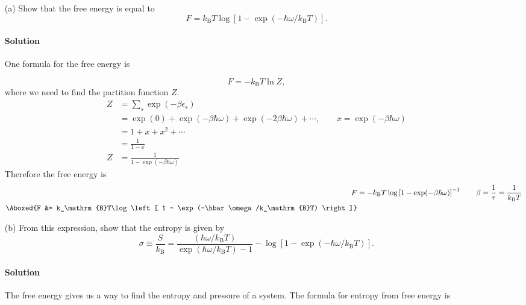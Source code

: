 \documentclass{article}
\begin{document}
	\begin{enumerate}
		\item[(a)] Show that the free energy is equal to
		\begin{equation}
			F = k_\mathrm{B}T \log\left[ 1 - \exp(-\hbar\omega/k_\mathrm{B}T) \right]. \label{FreeEnergyQuestion}
		\end{equation}
		\paragraph{Solution} One formula for the free energy is 
		
		\begin{equation}
			F = -k_\mathrm{B}T \ln Z, \label{FreeEnergySigma}
		\end{equation}
		where we need to find the partition function $Z$.
		\begin{equation}
			\begin{split}
				Z &= \sum_{s} \exp(-\beta\epsilon_s) \\
				&= \exp(0) + \exp(-\beta\hbar\omega) + \exp(-2\beta\hbar\omega) + \cdots, \qquad x = \exp(-\beta\hbar\omega) \\
				&= 1 + x + x^2 + \cdots \\
				&= \frac{1}{1 - x} \\
				Z &= \frac{1}{1 - \exp(-\beta\hbar\omega)}
			\end{split} \label{P1Partition}
		\end{equation}
		Therefore the free energy is
		\begin{equation}
			\begin{split}
				F &= -k_\mathrm{B}T\log\left[ 1 - \exp(-\beta\hbar\omega) \right]^{-1} \qquad \beta = \frac{1}{\tau} = \frac{1}{k_\mathrm{B}T} \\
				\Aboxed{F &= k_\mathrm{B}T\log\left[ 1 - \exp(-\hbar\omega/k_\mathrm{B}T) \right]}
			\end{split} \label{P1FreeEnergyAnswer}
		\end{equation}
		
		\item[(b)] From this expression, show that the entropy is given by
		\begin{equation}
			\sigma \equiv \frac{S}{k_\mathrm{B}} = \frac{(\hbar\omega/k_\mathrm{B}T)}{\exp(\hbar\omega/k_\mathrm{B}T) - 1} - \log\left[ 1 - \exp(-\hbar\omega/k_\mathrm{B}T) \right].
		\end{equation}
		\paragraph{Solution} The free energy gives us a way to find the entropy and pressure of a system. The formula for entropy from free energy is
		

\end{enumerate}
\end{document}
